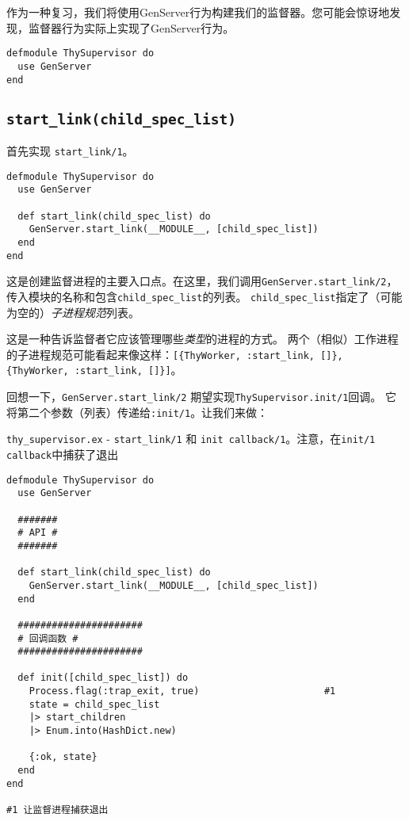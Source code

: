 作为一种复习，我们将使用GenServer行为构建我们的监督器。您可能会惊讶地发现，监督器行为实际上实现了GenServer行为。

\begin{code}{}
\begin{verbatim}
defmodule ThySupervisor do
  use GenServer
end
\end{verbatim}
\end{code}

\subsection{\texttt{start\_link(child\_spec\_list)}}

首先实现 \texttt{start\_link/1}。

\begin{code}{}
\begin{verbatim}
defmodule ThySupervisor do
  use GenServer

  def start_link(child_spec_list) do
    GenServer.start_link(__MODULE__, [child_spec_list])
  end
end
\end{verbatim}
\end{code}

这是创建监督进程的主要入口点。在这里，我们调用\texttt{GenServer.start\_link/2}，传入模块的名称和包含\texttt{child\_spec\_list}的列表。
\texttt{child\_spec\_list}指定了（可能为空的）\emph{子进程规范}列表。

这是一种告诉监督者它应该管理哪些\emph{类型}的进程的方式。
两个（相似）工作进程的子进程规范可能看起来像这样：\texttt{[\{ThyWorker, :start\_link, []\}, \{ThyWorker, :start\_link, []\}]}。

回想一下，\texttt{GenServer.start\_link/2} 期望实现\texttt{ThySupervisor.init/1}回调。
它将第二个参数（列表）传递给\texttt{:init/1}。让我们来做：


\begin{code}{\texttt{thy\_supervisor.ex} - \texttt{start\_link/1} 和 \texttt{init callback/1}。注意，在\texttt{init/1 callback}中捕获了退出}
\begin{verbatim}
defmodule ThySupervisor do
  use GenServer

  #######
  # API #
  #######

  def start_link(child_spec_list) do
    GenServer.start_link(__MODULE__, [child_spec_list])
  end

  ######################
  # 回调函数 #
  ######################

  def init([child_spec_list]) do
    Process.flag(:trap_exit, true)                      #1
    state = child_spec_list
    |> start_children
    |> Enum.into(HashDict.new)

    {:ok, state}
  end
end

#1 让监督进程捕获退出
\end{verbatim}
\label{lst:start_link_and_init_callback}
\end{code}


